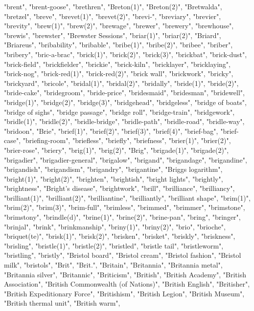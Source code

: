 "brent",
"brent-goose",
"brethren",
"Breton(1)",
"Breton(2)",
"Bretwalda",
"bretzel",
"breve",
"brevet(1)",
"brevet(2)",
"brevi-",
"breviary",
"brevier",
"brevity",
"brew(1)",
"brew(2)",
"brewage",
"brewer",
"brewery",
"brewhouse",
"brewis",
"brewster",
"Brewster Sessions",
"briar(1)",
"briar(2)",
"Briard",
"Briareus",
"bribability",
"bribable",
"bribe(1)",
"bribe(2)",
"bribee",
"briber",
"bribery",
"bric-a-brac",
"brick(1)",
"brick(2)",
"brick(3)",
"brickbat",
"brick-dust",
"brick-field",
"brickfielder",
"brickie",
"brick-kiln",
"bricklayer",
"bricklaying",
"brick-nog",
"brick-red(1)",
"brick-red(2)",
"brick wall",
"brickwork",
"bricky",
"brickyard",
"bricole",
"bridal(1)",
"bridal(2)",
"bridally",
"bride(1)",
"bride(2)",
"bride-cake",
"bridegroom",
"bride-price",
"bridesmaid",
"bridesman",
"bridewell",
"bridge(1)",
"bridge(2)",
"bridge(3)",
"bridgehead",
"bridgeless",
"bridge of boats",
"bridge of sighs",
"bridge passage",
"bridge roll",
"bridge-train",
"bridgework",
"bridle(1)",
"bridle(2)",
"bridle-bridge",
"bridle-path",
"bridle-road",
"bridle-way",
"bridoon",
"Brie",
"brief(1)",
"brief(2)",
"brief(3)",
"brief(4)",
"brief-bag",
"brief-case",
"briefing-room",
"briefless",
"briefly",
"briefness",
"brier(1)",
"brier(2)",
"brier-rose",
"briery",
"brig(1)",
"brig(2)",
"Brig",
"brigade(1)",
"brigade(2)",
"brigadier",
"brigadier-general",
"brigalow",
"brigand",
"brigandage",
"brigandine",
"brigandish",
"brigandism",
"brigandry",
"brigantine",
"Briggs logarithm",
"bright(1)",
"bright(2)",
"brighten",
"brightish",
"bright lights",
"brightly",
"brightness",
"Bright's disease",
"brightwork",
"brill",
"brilliance",
"brilliancy",
"brilliant(1)",
"brilliant(2)",
"brilliantine",
"brilliantly",
"brilliant shape",
"brim(1)",
"brim(2)",
"brim(3)",
"brim-full",
"brimless",
"brimmed",
"brimmer",
"brimstone",
"brimstony",
"brindle(d)",
"brine(1)",
"brine(2)",
"brine-pan",
"bring",
"bringer",
"brinjal",
"brink",
"brinkmanship",
"briny(1)",
"briny(2)",
"brio",
"brioche",
"briquet(te)",
"brisk(1)",
"brisk(2)",
"brisken",
"brisket",
"briskly",
"briskness",
"brisling",
"bristle(1)",
"bristle(2)",
"bristled",
"bristle tail",
"bristleworm",
"bristling",
"bristly",
"Bristol board",
"Bristol cream",
"Bristol fashion",
"Bristol milk",
"bristols",
"Brit",
"Brit.",
"Britain",
"Britannia",
"Britannia metal",
"Britannia silver",
"Britannic",
"Briticism",
"British",
"British Academy",
"British Association",
"British Commonwealth (of Nations)",
"British English",
"Britisher",
"British Expeditionary Force",
"Britishism",
"British Legion",
"British Museum",
"British thermal unit",
"British warm",
